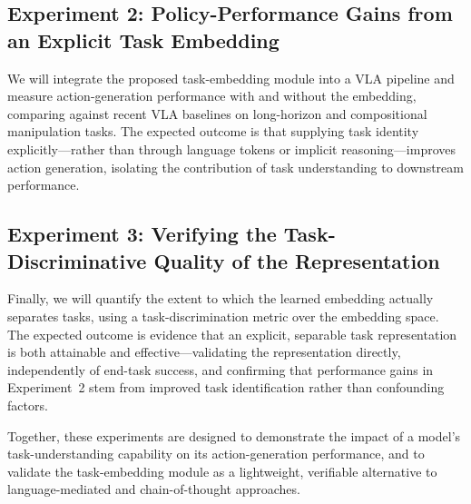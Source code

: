 \documentclass[11pt]{article}
\begin{document}
\subsection{Experiment 2: Policy-Performance Gains from an Explicit Task Embedding}

We will integrate the proposed task-embedding module into a VLA pipeline and measure action-generation performance with and without the embedding, comparing against recent VLA baselines on long-horizon and compositional manipulation tasks. The expected outcome is that supplying task identity explicitly---rather than through language tokens or implicit reasoning---improves action generation, isolating the contribution of task understanding to downstream performance.

\subsection{Experiment 3: Verifying the Task-Discriminative Quality of the Representation}

Finally, we will quantify the extent to which the learned embedding actually separates tasks, using a task-discrimination metric over the embedding space. The expected outcome is evidence that an explicit, separable task representation is both attainable and effective---validating the representation directly, independently of end-task success, and confirming that performance gains in Experiment~2 stem from improved task identification rather than confounding factors.

\medskip
\noindent Together, these experiments are designed to demonstrate the impact of a model's task-understanding capability on its action-generation performance, and to validate the task-embedding module as a lightweight, verifiable alternative to language-mediated and chain-of-thought approaches.
\end{document}
